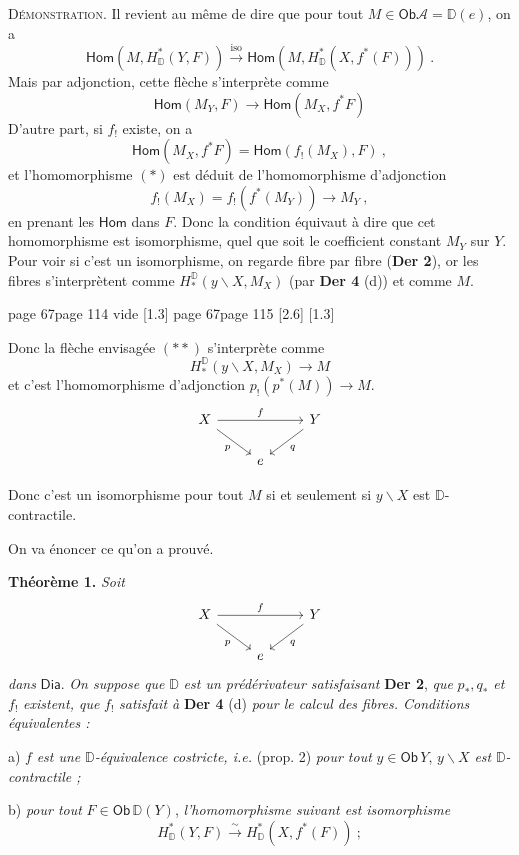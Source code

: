 \documentclass[11pt,leqno]{article}
\newcommand{\printedpage}[1]{\marginnote{\scriptsize\sffamily ed.\ #1}}
\newcommand{\msp}[1]{%
  \begingroup\def\thismsp{#1}\def\blankmsp{page 114 vide}%
  \ifx\thismsp\blankmsp
    \marginnote{\scriptsize\sffamily [114: vide]}[1.3\baselineskip]%
  \else\def\followingmsp{page 115}%
    \ifx\thismsp\followingmsp
      \marginnote{\scriptsize\sffamily [page 115]}[2.6\baselineskip]%
    \else\marginnote{\scriptsize\sffamily [#1]}[1.3\baselineskip]\fi
  \fi\endgroup}
\newcommand{\DD}{\ensuremath{\mathbb{D}}}
\newcommand{\cA}{\ensuremath{\mathcal{A}}}
\newcommand{\Dia}{\ensuremath{\mathsf{Dia}}}
\newcommand{\Ob}{\ensuremath{\mathsf{Ob}}}
\newcommand{\Hom}{\ensuremath{\mathsf{Hom}}}
\newcommand{\isoto}{\overset{\sim}{\to}}
\newcommand{\D}{\ensuremath{\mathbb{D}}}
\begin{document}
\noindent\textsc{Démonstration}. Il revient au même de dire que pour tout $M \in \Ob \cA = \DD(e)$, on a
\[
\Hom(M, H^*_{\DD}(Y, F)) \overset{\mathrm{iso}}{\longrightarrow} \Hom(M, H^*_{\DD}(X, f^*(F))) \ .
\]
Mais par adjonction, cette flèche s'interprète comme
\[
\Hom(M_Y, F) \longrightarrow \Hom(M_X, f^*F) \tag*{$(*)$}
\]
D'autre part, si $f_!$ existe, on a
\[
\Hom(M_X, f^*F) = \Hom(f_!(M_X), F) \ ,
\]
et l'homomorphisme $(*)$ est déduit de l'homomorphisme d'adjonction
\[
f_!(M_X) = f_!(f^*(M_Y)) \longrightarrow M_Y \ , \tag*{$(**)$}
\]
en prenant les $\Hom$ dans $F$. Donc la condition équivaut à dire que cet homomorphisme est isomorphisme, quel que soit le coefficient constant $M_Y$ sur $Y$. Pour voir si c'est un isomorphisme, on regarde fibre par fibre (\textbf{Der 2}), or les fibres s'interprètent comme $H^{\DD}_*(y\backslash X, M_X)$ (par \textbf{Der 4} (d)) et comme $M$.

\printedpage{39}
\msp{page 67}

\noindent Donc la flèche envisagée $(**)$ s'interprète comme
\[
H_*^{\D}(y\backslash X, M_X) \longrightarrow M
\]
et c'est l'homomorphisme d'adjonction $p_!(p^*(M)) \to M$.
\[
\begin{tikzcd}
X \arrow[rr, "f"] \arrow[dr, "p"{swap}] & & Y \arrow[dl, "q"] \\
& e &
\end{tikzcd}
\]

\noindent Donc c'est un isomorphisme pour tout $M$ si et seulement si $y\backslash X$ est $\D$-contractile.

\noindent On va énoncer ce qu'on a prouvé.

\noindent\textbf{Théorème 1.} \textit{Soit}
\[
\begin{tikzcd}
X \arrow[rr, "f"] \arrow[dr, "p"{swap}] & & Y \arrow[dl, "q"] \\
& e &
\end{tikzcd}
\]
\textit{dans} $\Dia$. \textit{On suppose que} $\D$ \textit{est un prédérivateur satisfaisant} \textbf{Der 2}, \textit{que} $p_*, q_*$ \textit{et} $f_!$ \textit{existent, que} $f_!$ \textit{satisfait à} \textbf{Der 4} (d) \textit{pour le calcul des fibres. Conditions équivalentes :}

a) $f$ \textit{est une} $\D$\textit{-équivalence costricte, i.e.} (prop. 2) \textit{pour tout} $y \in \Ob\, Y$, $y\backslash X$ \textit{est} $\D$\textit{-contractile ;}

b) \textit{pour tout} $F \in \Ob\, \D(Y)$, \textit{l'homomorphisme suivant est} \textit{isomorphisme}
\[
H^*_{\D}(Y, F) \isoto H^*_{\D}(X, f^*(F)) \ ;
\]
\end{document}
